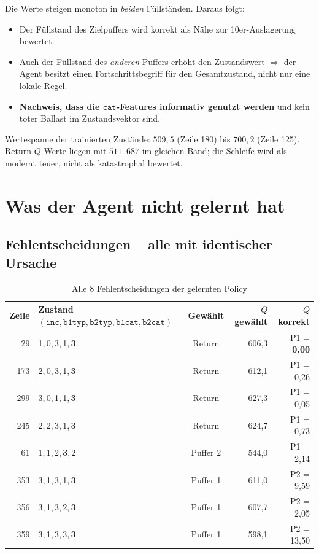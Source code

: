 \documentclass[11pt,a4paper]{article}
\newcommand{\inc}{\texttt{inc}}
\newcommand{\bit}{\texttt{b1typ}}
\newcommand{\bzt}{\texttt{b2typ}}
\newcommand{\bic}{\texttt{b1cat}}
\newcommand{\bzc}{\texttt{b2cat}}
\newcommand{\cat}{\texttt{cat}}
\begin{document}
Die Werte steigen monoton in \emph{beiden} Füllständen. Daraus folgt:
\begin{itemize}[leftmargin=*]
  \item Der Füllstand des Zielpuffers wird korrekt als Nähe zur
        10er-Auslagerung bewertet.
  \item Auch der Füllstand des \emph{anderen} Puffers erhöht den Zustandswert
        $\Rightarrow$ der Agent besitzt einen Fortschrittsbegriff für den
        Gesamtzustand, nicht nur eine lokale Regel.
  \item \textbf{Nachweis, dass die $\cat$-Features informativ genutzt werden}
        und kein toter Ballast im Zustandsvektor sind.
\end{itemize}

Wertespanne der trainierten Zustände: $509{,}5$ (Zeile 180) bis $700{,}2$
(Zeile 125). Return-$Q$-Werte liegen mit $511$--$687$ im gleichen Band; die
Schleife wird als moderat teuer, nicht als katastrophal bewertet.

\section{Was der Agent nicht gelernt hat}

\subsection{Fehlentscheidungen -- alle mit identischer Ursache}
\label{sec:fehler}

\begin{table}[htbp]
\centering
\caption{Alle 8 Fehlentscheidungen der gelernten Policy}
\begin{tabular}{@{}rlcrr@{}}
\toprule
\textbf{Zeile} & \textbf{Zustand $(\inc,\bit,\bzt,\bic,\bzc)$} &
\textbf{Gewählt} & \textbf{$Q$ gewählt} & \textbf{$Q$ korrekt} \\
\midrule
 29 & 1,\,0,\,3,\,1,\,\textbf{3} & Return   & 606{,}3 & P1 = \textbf{0{,}00} \\
173 & 2,\,0,\,3,\,1,\,\textbf{3} & Return   & 612{,}1 & P1 = 0{,}26 \\
299 & 3,\,0,\,1,\,1,\,\textbf{3} & Return   & 627{,}3 & P1 = 0{,}05 \\
245 & 2,\,2,\,3,\,1,\,\textbf{3} & Return   & 624{,}7 & P1 = 0{,}73 \\
 61 & 1,\,1,\,2,\,\textbf{3},\,2 & Puffer 2 & 544{,}0 & P1 = 2{,}14 \\
353 & 3,\,1,\,3,\,1,\,\textbf{3} & Puffer 1 & 611{,}0 & P2 = 9{,}59 \\
356 & 3,\,1,\,3,\,2,\,\textbf{3} & Puffer 1 & 607{,}7 & P2 = 2{,}05 \\
359 & 3,\,1,\,3,\,3,\,\textbf{3} & Puffer 1 & 598{,}1 & P2 = 13{,}50 \\
\bottomrule
\end{tabular}
\end{table}
\end{document}
